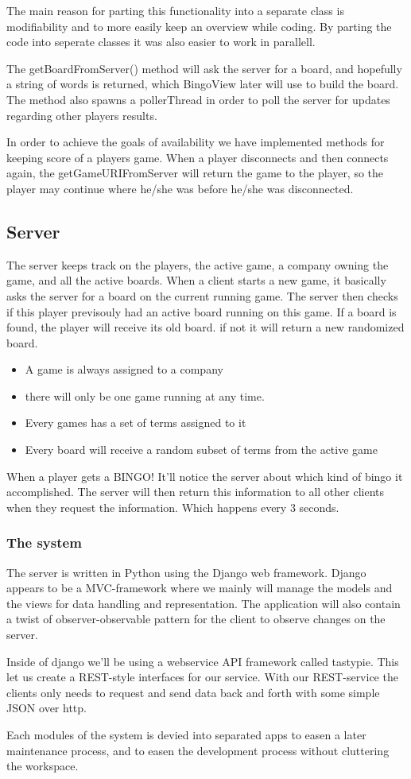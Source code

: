 The main reason for parting this functionality into a separate class is modifiability and to more easily keep an overview while coding. By parting the code into seperate classes it was also easier to work in parallell. 

The getBoardFromServer() method will ask the server for a board, and hopefully a string of words is returned, which BingoView later will use to build the board. The method also spawns a pollerThread in order to poll the server for updates regarding other players results.

In order to achieve the goals of availability we have implemented methods for keeping score of a players game. When a player disconnects and then connects again, the getGameURIFromServer will return the game to the player, so the player may continue where he/she was before he/she was disconnected.


\subsection{Server}
The server keeps track on the players, the active game, a company owning the game, and all the active boards. When a client starts a new game, it basically asks the server for a board on the current running game. The server then checks if this player previsouly had an active board running on this game. If a board is found, the player will receive its old board. if not it will return a new randomized board.

\begin{itemize}
	\item A game is always assigned to a company
	\item there will only be one game running at any time. 
	\item Every games has a set of terms assigned to it
	\item Every board will receive a random subset of terms from the active game
\end{itemize}

When a player gets a BINGO! It'll notice the server about which kind of bingo it accomplished. The server will then return this information to all other clients when they request the information. Which happens every 3 seconds.

\subsubsection{The system}
The server is written in Python using the Django web framework. Django appears to be a MVC-framework where we mainly will manage the models and the views for data handling and representation. The application will also contain a twist of observer-observable pattern for the client to observe changes on the server.

Inside of django we'll be using a webservice API framework called tastypie. This let us create a REST-style interfaces for our service. With our REST-service the clients only needs to request and send data back and forth with some simple JSON over http.

Each modules of the system is devied into separated apps to easen a later maintenance process, and to easen the development process without cluttering the workspace.